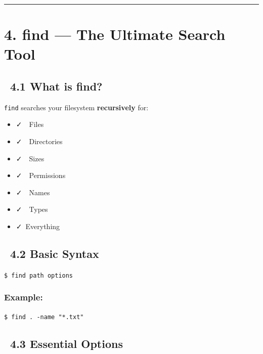 \documentclass[12pt]{article}
\newcommand{\searchicon}{\faSearch}
\newcommand{\brainicon}{\faBrain}
\newcommand{\targeticon}{\faBullseye}
\newcommand{\checkicon}{\faCheck}
\newcommand{\fileicon}{\faFile}
\newcommand{\foldericon}{\faFolder}
\newcommand{\sizeicon}{\faWeightHanging}
\newcommand{\permissionicon}{\faLock}
\begin{document}
\vspace{1em}
\begin{center}
\color{teamred}\rule{0.8\textwidth}{1pt}
\end{center}

\section*{4. find — The Ultimate Search Tool}

\subsection*{\searchicon\ 4.1 What is find?}

\texttt{find} searches your filesystem \textbf{recursively} for:

\begin{itemize}
    \item \checkicon\ \fileicon\ Files
    \item \checkicon\ \foldericon\ Directories
    \item \checkicon\ \sizeicon\ Sizes
    \item \checkicon\ \permissionicon\ Permissions
    \item \checkicon\ \searchicon\ Names
    \item \checkicon\ \fileicon\ Types
    \item \checkicon\ Everything
\end{itemize}

\subsection*{\brainicon\ 4.2 Basic Syntax}

\begin{highlightbox}
\texttt{\$ find path options}
\end{highlightbox}

\subsubsection*{Example:}

\begin{highlightbox}
\texttt{\$ find . -name "*.txt"}
\end{highlightbox}

\subsection*{\targeticon\ 4.3 Essential Options}
\end{document}
